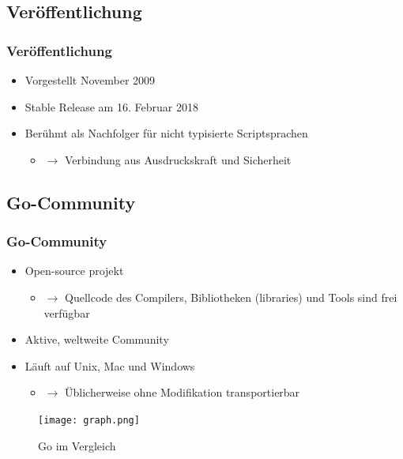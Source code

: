 \documentclass{beamer}
\begin{document}

\subsection{Ver\"offentlichung}
\begin{frame}
\frametitle{Ver\"offentlichung}

\begin{itemize}
\setlength{\itemsep}{40pt}
\item Vorgestellt November 2009
\item Stable Release am 16. Februar 2018
\item Ber\"uhmt als Nachfolger für nicht typisierte Scriptsprachen
\begin{itemize}
\item[] $\rightarrow$ Verbindung aus Ausdruckskraft und Sicherheit
\end{itemize}
\end{itemize}

\end{frame}


\subsection{Go-Community}
\begin{frame}
\frametitle{Go-Community}

\begin{itemize}
\setlength{\itemsep}{44pt}
\item Open-source projekt
\begin{itemize}
\item[] $\rightarrow$ Quellcode des Compilers, Bibliotheken (libraries) und Tools sind frei verfügbar
\end{itemize}
\item Aktive, weltweite Community
\item L\"auft auf Unix, Mac und Windows
\begin{itemize}
\item[] $\rightarrow$ \"Ublicherweise ohne Modifikation transportierbar
\end{itemize}
\end{itemize}

\end{frame}

\begin{frame}

\begin{figure}
\texttt{[image: graph.png]}
\caption{Go im Vergleich}
\end{figure}

\end{frame}
\end{document}
